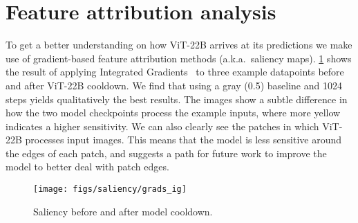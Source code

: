 \documentclass{article}
\newcommand{\chonk}{\mbox{ViT-22B}\xspace}
\begin{document}
\section{Feature attribution analysis}
\label{app:feature_attribution}
To get a better understanding on how \chonk arrives at its predictions we make use of gradient-based feature attribution methods (a.k.a.\ saliency maps). 
\cref{fig:featureattribution} shows the result of applying Integrated Gradients~\citep[][IG]{sundararajan2017axiomatic} to three example datapoints before and after \chonk cooldown. We find that using a gray (0.5) baseline and 1024 steps yields qualitatively the best results. 
The images show a subtle difference in how the two model checkpoints process the example inputs, where more yellow indicates a higher sensitivity.
We can also clearly see the patches in which \chonk processes input images. This means that the model is less sensitive around the edges of each patch, and suggests a path for future work to improve the model to better deal with patch edges.

\begin{figure}[h]
    \centering
    \texttt{[image: figs/saliency/grads\_ig]}
    \caption{Saliency before and after model cooldown.}
    \label{fig:featureattribution}
\end{figure} 

 
\end{document}
